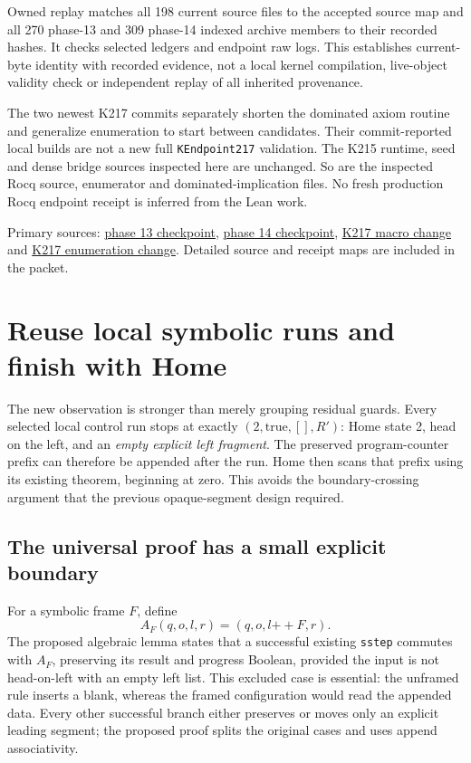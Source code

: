 \documentclass[11pt]{article}
\newcommand{\code}[1]{\texttt{#1}}
\begin{document}
Owned replay matches all 198 current source files to the accepted source map and all 270 phase-13 and 309 phase-14 indexed archive members to their recorded hashes. It checks selected ledgers and endpoint raw logs. This establishes current-byte identity with recorded evidence, not a local kernel compilation, live-object validity check or independent replay of all inherited provenance.

The two newest K217 commits separately shorten the dominated axiom routine and generalize enumeration to start between candidates. Their commit-reported local builds are not a new full \code{KEndpoint217} validation. The K215 runtime, seed and dense bridge sources inspected here are unchanged. So are the inspected Rocq source, enumerator and dominated-implication files. No fresh production Rocq endpoint receipt is inferred from the Lean work.

Primary sources: \href{https://github.com/VladimirReshetnikov/ProveIt/blob/6d9800d1ca67c52db0eb6e1c65df7b5cab9cdb95/Computability/BusyBeaver/Research/ZFC/k225-formal/verification/k215/simplification/phase13/README.md}{phase 13 checkpoint}, \href{https://github.com/VladimirReshetnikov/ProveIt/blob/6d9800d1ca67c52db0eb6e1c65df7b5cab9cdb95/Computability/BusyBeaver/Research/ZFC/k225-formal/verification/k215/simplification/phase14/README.md}{phase 14 checkpoint}, \href{https://github.com/VladimirReshetnikov/ProveIt/commit/ab6ceabe32ee}{K217 macro change} and \href{https://github.com/VladimirReshetnikov/ProveIt/commit/6d9800d1ca67c52db0eb6e1c65df7b5cab9cdb95}{K217 enumeration change}. Detailed source and receipt maps are included in the packet.

\section{Reuse local symbolic runs and finish with Home}
The new observation is stronger than merely grouping residual guards. Every selected local control run stops at exactly $(2,\mathrm{true},[],R')$: Home state 2, head on the left, and an \emph{empty explicit left fragment}. The preserved program-counter prefix can therefore be appended after the run. Home then scans that prefix using its existing theorem, beginning at zero. This avoids the boundary-crossing argument that the previous opaque-segment design required.

\subsection{The universal proof has a small explicit boundary}
For a symbolic frame $F$, define
\[
 A_F(q,o,l,r)=(q,o,l\mathbin{+\!+}F,r).
\]
The proposed algebraic lemma states that a successful existing \code{sstep} commutes with $A_F$, preserving its result and progress Boolean, provided the input is not head-on-left with an empty left list. This excluded case is essential: the unframed rule inserts a blank, whereas the framed configuration would read the appended data. Every other successful branch either preserves or moves only an explicit leading segment; the proposed proof splits the original cases and uses append associativity.
\end{document}
